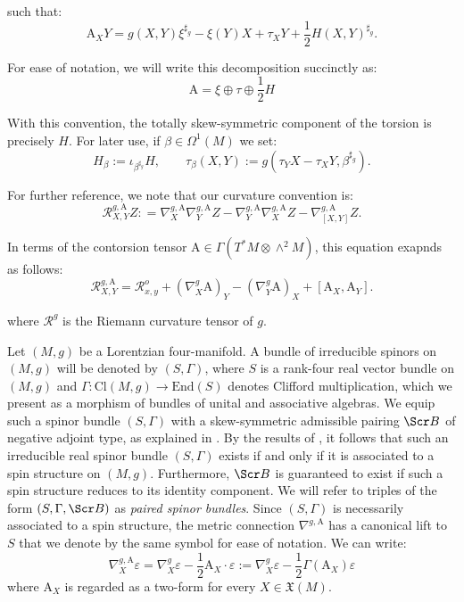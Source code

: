 \documentclass[10pt,reqno,a4paper]{amsart}
\theoremstyle{plain}
\theoremstyle{definition}
\theoremstyle{remark}
\theoremstyle{remark}
\def\mA{\mathrm{A}}
\newcommand{\End}{\mathrm{End}}
\def\cR{{\mathcal R}}
\def\cB{\Scr B}
\def\Cl{\mathrm{Cl}}
\renewcommand{\(}{ (}
\renewcommand{\)}{ )}
\begin{document}
\noindent
such that:
\begin{equation}
\label{eq:contorsioncomponents}
\mA_XY = g(X,Y)\xi^{\sharp_g}-\xi(Y)X+\tau_X Y + \frac12 H(X,Y)^{\sharp_g}.
\end{equation}

\noindent
For ease of notation, we will write this decomposition succinctly as:
\begin{equation*}
\mA = \xi \oplus \tau \oplus \frac{1}{2} H    
\end{equation*}

\noindent
With this convention, the totally skew-symmetric component of the torsion is precisely $H$. For later use, if $\beta\in\Omega^1(M)$ we set:
\begin{equation}
\label{eq:Htaubeta} 
H_\beta:=\iota_{\beta^{\sharp_g}}H, \qquad \tau_\beta(X,Y) := g (\tau_Y X -\tau_X Y,\beta^{\sharp_g} ).
\end{equation}  

\noindent
For further reference, we note that our curvature convention is:
\begin{equation*} 
\cR^{g,\mA}_{X,Y}Z : = \nabla^{g,\mA}_X \nabla^{g,\mA}_Y Z - \nabla^{g,\mA}_Y \nabla^{g,\mA}_X Z - \nabla^{g,\mA}_{[X,Y]} Z.
\end{equation*}

\noindent
In terms of the contorsion tensor $\mA \in  \Gamma(T^*M\otimes\wedge^2 M)$, this equation exapnds as follows:
\begin{equation} 
\cR^{g,\mA}_{X,Y} = \cR^o_{x,y} + (\nabla^g_X\mA)_Y - (\nabla^g_Y\mA)_X + [\mA_X,\mA_Y].
\end{equation}

\noindent
where $\cR^g$ is the Riemann curvature tensor of $g$. \medskip

\noindent
Let $(M,g)$ be a Lorentzian four-manifold. A bundle of irreducible spinors on $(M,g)$ will be denoted by $(S ,\Gamma)$, where $S$ is a rank-four real vector bundle on $(M,g)$ and $\Gamma \colon \Cl(M,g) \to \End(S)$ denotes Clifford multiplication, which we present as a morphism of bundles of unital and associative algebras. We equip such a spinor bundle $(S,\Gamma)$ with a skew-symmetric admissible pairing $\cB$ of negative adjoint type, as explained in \cite{Cortes:2019xmk}. By the results of \cite{Lazaroiu:2016vov}, it follows that such an irreducible real spinor bundle $(S,\Gamma)$ exists if and only if it is associated to a spin structure on $(M,g)$. Furthermore, $\cB$ is guaranteed to exist if such a spin structure reduces to its identity component. We will refer to triples of the form $(S,\Gamma,\cB)$ as \emph{paired spinor bundles}. Since $(S,\Gamma)$ is necessarily associated to a spin structure, the metric connection $\nabla^{g,\mA}$ has a canonical lift to $S$ that we denote by the same symbol for ease of notation. We can write:
\begin{equation*} 
\nabla^{g,\mA}_X\varepsilon = \nabla^g_X\varepsilon-\frac12\mA_X\cdot\varepsilon := \nabla^g_X\varepsilon-\frac12 \Gamma(\mA_X) \varepsilon 
\end{equation*}
where $\mA_X$ is regarded as a two-form for every $X\in \mathfrak{X}(M)$. 
\end{document}
